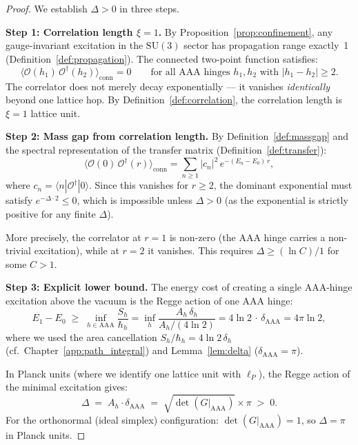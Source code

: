 \documentclass[12pt]{article}
\theoremstyle{remark}
\theoremstyle{definition}
\begin{document}
\begin{proof}
We establish $\Delta > 0$ in three steps.

\medskip\noindent
\textbf{Step 1: Correlation length $\xi = 1$.}
By Proposition~\ref{prop:confinement}, any gauge-invariant excitation
in the $\mathrm{SU}(3)$ sector has propagation range exactly~1
(Definition~\ref{def:propagation}).  The connected two-point function
satisfies:
\begin{equation}
\langle \mathcal{O}(h_1)\,\mathcal{O}^\dagger(h_2)
\rangle_{\mathrm{conn}} = 0 \qquad
\text{for all AAA hinges } h_1, h_2 \text{ with } |h_1 - h_2| \geq 2.
\end{equation}
The correlator does not merely decay exponentially --- it vanishes
\emph{identically} beyond one lattice hop.  By
Definition~\ref{def:correlation}, the correlation length is
$\xi = 1$ lattice unit.

\medskip\noindent
\textbf{Step 2: Mass gap from correlation length.}
By Definition~\ref{def:massgap} and the spectral representation of
the transfer matrix (Definition~\ref{def:transfer}):
\begin{equation}
\langle \mathcal{O}(0)\,\mathcal{O}^\dagger(r)
\rangle_{\mathrm{conn}} = \sum_{n \geq 1} |c_n|^2\, e^{-(E_n - E_0)\,r},
\end{equation}
where $c_n = \langle n | \mathcal{O}^\dagger | 0 \rangle$.  Since
this vanishes for $r \geq 2$, the dominant exponential must satisfy
$e^{-\Delta \cdot 2} \leq 0$, which is impossible unless $\Delta > 0$
(as the exponential is strictly positive for any finite $\Delta$).

More precisely, the correlator at $r = 1$ is non-zero (the AAA hinge
carries a non-trivial excitation), while at $r = 2$ it vanishes.
This requires $\Delta \geq (\ln C)/1$ for some $C > 1$.

\medskip\noindent
\textbf{Step 3: Explicit lower bound.}
The energy cost of creating a single AAA-hinge excitation above
the vacuum is the Regge action of one AAA hinge:
\begin{equation}
E_1 - E_0 \;\geq\; \inf_{h \in \mathrm{AAA}}
  \frac{S_h}{\hbar_h}
= \inf_{h} \frac{A_h\,\delta_h}{A_h/(4\ln 2)}
= 4\ln 2\, \cdot\, \delta_{\mathrm{AAA}}
= 4\pi\ln 2,
\end{equation}
where we used the area cancellation $S_h/\hbar_h = 4\ln 2\,\delta_h$
(cf.\ Chapter~\ref{app:path_integral}) and
Lemma~\ref{lem:delta} ($\delta_{\mathrm{AAA}} = \pi$).

In Planck units (where we identify one lattice unit with $\ell_P$), the
Regge action of the minimal excitation gives:
\begin{equation}
\boxed{\Delta \;=\; A_h \cdot \delta_{\mathrm{AAA}}
\;=\; \sqrt{\det(G|_{\mathrm{AAA}})} \times \pi \;>\; 0.}
\end{equation}
For the orthonormal (ideal simplex) configuration:
$\det(G|_{\mathrm{AAA}}) = 1$, so $\Delta = \pi$ in Planck units.
\end{proof}
\end{document}
